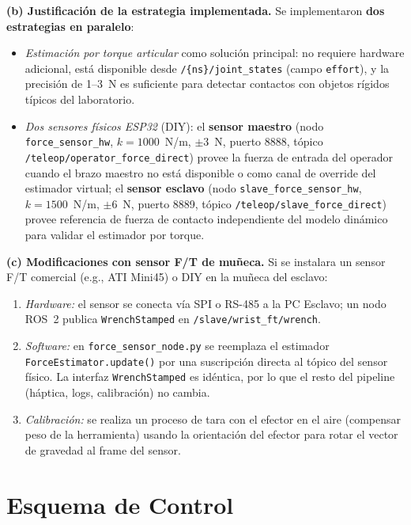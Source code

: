 \documentclass[journal,10pt,twoside]{IEEEtran}
\begin{document}
\textbf{(b) Justificación de la estrategia implementada.}
Se implementaron \textbf{dos estrategias en paralelo}:
\begin{itemize}
  \item \textit{Estimación por torque articular} como solución
        principal: no requiere hardware adicional, está disponible
        desde \texttt{/\{ns\}/joint\_states} (campo \texttt{effort}),
        y la precisión de 1--3~N es suficiente para detectar contactos
        con objetos rígidos típicos del laboratorio.
  \item \textit{Dos sensores físicos ESP32} (DIY): el \textbf{sensor
        maestro} (nodo \texttt{force\_sensor\_hw}, $k=1000$~N/m,
        $\pm3$~N, puerto 8888, tópico
        \texttt{/teleop/operator\_force\_direct}) provee la fuerza
        de entrada del operador cuando el brazo maestro no está
        disponible o como canal de override del estimador virtual;
        el \textbf{sensor esclavo} (nodo \texttt{slave\_force\_sensor\_hw},
        $k=1500$~N/m, $\pm6$~N, puerto 8889, tópico
        \texttt{/teleop/slave\_force\_direct}) provee referencia de
        fuerza de contacto independiente del modelo dinámico para
        validar el estimador por torque.
\end{itemize}

\textbf{(c) Modificaciones con sensor F/T de muñeca.}
Si se instalara un sensor F/T comercial (e.g., ATI Mini45) o DIY
en la muñeca del esclavo:
\begin{enumerate}[label=\roman*.]
  \item \textit{Hardware:} el sensor se conecta vía SPI o RS-485 a
        la PC Esclavo; un nodo ROS~2 publica \texttt{WrenchStamped}
        en \texttt{/slave/wrist\_ft/wrench}.
  \item \textit{Software:} en \texttt{force\_sensor\_node.py} se
        reemplaza el estimador \texttt{ForceEstimator.update()} por
        una suscripción directa al tópico del sensor físico. La
        interfaz \texttt{WrenchStamped} es idéntica, por lo que el
        resto del pipeline (háptica, logs, calibración) no cambia.
  \item \textit{Calibración:} se realiza un proceso de tara con el
        efector en el aire (compensar peso de la herramienta) usando
        la orientación del efector para rotar el vector de gravedad al
        frame del sensor.
\end{enumerate}

\section{Esquema de Control}
\label{sec:control}
\end{document}
